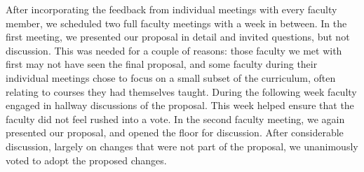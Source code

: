 \documentclass[english,aps,pra,reprint,noshowpacs,superscriptaddress]{revtex4-1}
\begin{document}
After incorporating the feedback from  individual meetings with every
faculty member, we scheduled
two full faculty meetings with a week in between.  In the first meeting,
we presented our proposal in detail and invited questions, but not discussion.
This was needed for a couple of reasons:  those faculty we met with first
may not have seen the final proposal, and some faculty during their
individual meetings chose to focus on a small subset of the
curriculum, often relating to courses they had themselves taught.
During the following week faculty engaged in hallway discussions of the proposal.
This week helped ensure that the faculty did not feel rushed into a vote.
In the second faculty meeting, we again presented our proposal, and opened
the floor for discussion.  After considerable discussion, largely on
changes that were not part of the proposal, we unanimously voted to adopt
the proposed changes.

\newcommand\mathcourse[2]{\emph{#1}}
\newcommand\noted[2]{\textbf{#1} (#2)}
\newcommand\paradigm[1]{{\sc #1} (3)}
\newcommand\capstone[1]{#1 (3)}
\newcommand\onecredit[1]{#1 (1)}
\newcommand\threecredit[1]{#1 (3)}
\newcommand\fourcredit[1]{#1 (4)}
\end{document}
